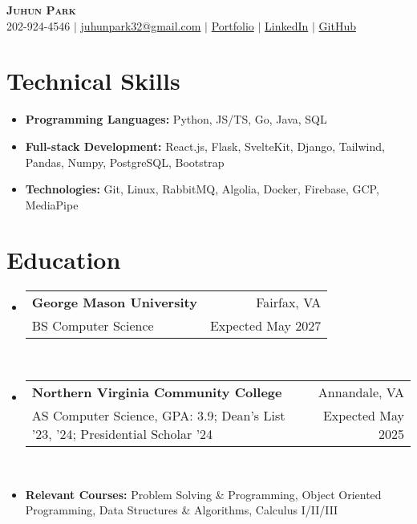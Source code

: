 \documentclass[letterpaper,11pt]{article}
\makeatletter
\newcommand{\resumeItem}[1]{
  \item\small{
    {#1 \vspace{3pt}}
  }
}
\newcommand{\resumeItemThin}[1]{
  \item\small{
    {#1 \vspace{-5pt}}
  }
}
\newcommand{\resumeSubheading}[4]{
    \item
    \begin{tabular*}{0.985\textwidth}[t]{l@{\extracolsep{\fill}}r@{\hspace{-0.1in}}}
        \small{\textbf{#1}} & \small{#2} \\
        \small#3 & \small #4 \\
    \end{tabular*}\vspace{-3pt}
}
\newcommand{\resumeSubHeadingListStart}{\begin{itemize}[leftmargin=0.00in, rightmargin=-0.2in, label={}]\vspace{1pt}}
\newcommand{\resumeSubHeadingListEnd}{\end{itemize}\vspace{-10pt}}
\newcommand{\resumeItemListStart}{\begin{itemize}[leftmargin=0.15in, rightmargin=0.15in]}
\newcommand{\resumeItemListEnd}{\end{itemize}\vspace{-10pt}}
\makeatother
\begin{document}

\begin{center}
  \textbf{\Huge \scshape {Juhun Park}} \\ \vspace{1pt}
  \small 202-924-4546 $|$
  \href{mailto:juhunpark32@gmail.com}{juhunpark32@gmail.com} $|$
  \href{https://juhun-park.vercel.app/}{Portfolio} $|$
  \href{https://linkedin.com/in/juhun-park}{LinkedIn} $|$
  \href{https://github.com/juhun32}{GitHub} \\
\end{center}

\vspace{-10pt}


\section{Technical Skills}
\vspace{3pt}
\resumeItemListStart
\resumeItemThin{\textbf{Programming Languages: }{Python, JS/TS, Go, Java, SQL}}\\
\resumeItemThin{\textbf{Full-stack Development: }{React.js, Flask, SvelteKit, Django, Tailwind, Pandas, Numpy, PostgreSQL, Bootstrap}}\\
\resumeItemThin{\textbf{Technologies: }{Git, Linux, RabbitMQ, Algolia, Docker, Firebase, GCP, MediaPipe}}\\
\resumeItemListEnd


\section{Education}
\resumeSubHeadingListStart
\resumeSubheading
{George Mason University}{Fairfax, VA}
{BS Computer Science}{Expected May 2027}\\

\resumeSubheading
{Northern Virginia Community College}{Annandale, VA}
{AS Computer Science, GPA: 3.9; Dean's List '23, '24; Presidential Scholar '24}{Expected May 2025} \\

\resumeItem{\textbf{Relevant Courses: }{Problem Solving \& Programming, Object Oriented Programming, Data Structures \& Algorithms, Calculus I/II/III}}
\resumeSubHeadingListEnd
\vspace{-3pt}

\end{document}
